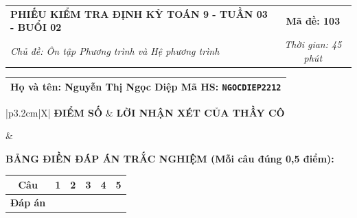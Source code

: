 \documentclass[12pt,a4paper]{article}
\begin{document}
\newpage


\noindent
\begin{tabularx}{\linewidth}{|X|c|}
\hline
\textbf{PHIẾU KIỂM TRA ĐỊNH KỲ TOÁN 9 - TUẦN 03 - BUỔI 02} & \textbf{Mã đề: 103} \\
\textit{Chủ đề: Ôn tập Phương trình và Hệ phương trình} & \textit{Thời gian: 45 phút} \\
\hline
\end{tabularx}

\vspace{1mm}

\noindent
\begin{tabularx}{\linewidth}{|X|}
\hline
\rule[-2mm]{0pt}{7.5mm}\textbf{Họ và tên:} \textbf{\large Nguyễn Thị Ngọc Diệp} \hfill \textbf{Mã HS:} \texttt{NGOCDIEP2212} \quad \\
\hline
\end{tabularx}

\vspace{1mm}

\noindent
\begin{tabularx}{\linewidth}{|p{3.2cm}|X|}
\hline
\centering\textbf{ĐIỂM SỐ} & \centering\textbf{LỜI NHẬN XÉT CỦA THẦY CÔ} \tabularnewline
\hline
\rule{0pt}{1.3cm} & \tabularnewline
\hline
\end{tabularx}

\vspace{1.2mm}

\noindent\textbf{BẢNG ĐIỀN ĐÁP ÁN TRẮC NGHIỆM (Mỗi câu đúng 0,5 điểm):}
\vspace{0.8mm}

\noindent
\renewcommand{\arraystretch}{1.35}
\begin{tabularx}{\linewidth}{|c|*{5}{>{\centering\arraybackslash}X|}}
\hline
\textbf{Câu} & \textbf{1} & \textbf{2} & \textbf{3} & \textbf{4} & \textbf{5} \\
\hline
\textbf{Đáp án} & & & & & \\
\hline
\end{tabularx}
\renewcommand{\arraystretch}{1.0}

\vspace{1.5mm}
\end{document}
